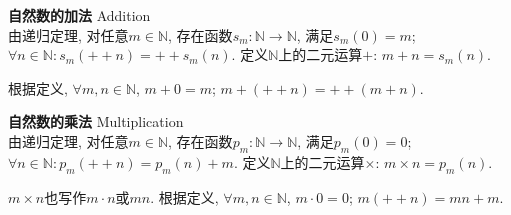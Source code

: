 \begin{dfn}\textbf{自然数的加法} Addition\\
由递归定理, 对任意$m\in \mathbb{N}$, 存在函数$s_m: \mathbb{N} \to  \mathbb{N}$, 满足$s_m(0)=m$; $\forall n\in \mathbb{N}: s_m(++n)=++s_m(n)$. 定义$\mathbb{N}$上的二元运算$+$: $m+n=s_m(n)$. 
\end{dfn}
根据定义, $\forall m,n \in \mathbb{N}$, $m+0=m$; $m+(++n)=++(m+n)$.

\begin{dfn}\textbf{自然数的乘法} Multiplication\\
由递归定理, 对任意$m\in \mathbb{N}$, 存在函数$p_m: \mathbb{N} \to  \mathbb{N}$, 满足$p_m(0)=0$; $\forall n\in \mathbb{N}: p_m(++n)=p_m(n)+m$. 定义$\mathbb{N}$上的二元运算$\times$: $m\times n=p_m(n)$. 
\end{dfn}
$m\times n$也写作$m\cdot n$或$mn$. 根据定义, $\forall m,n \in \mathbb{N}$, $m\cdot  0=0$; $m(++n)=mn+m$. 

